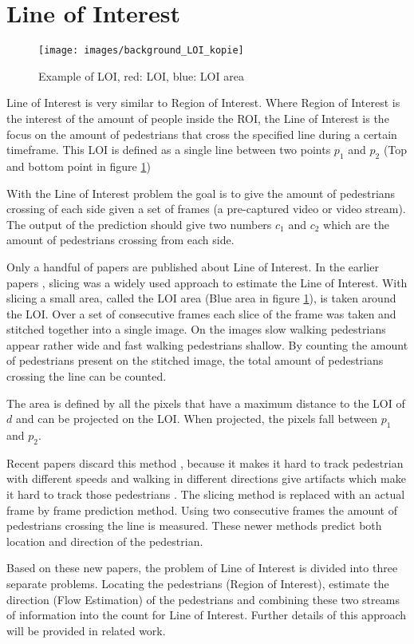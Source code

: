 \section{Line of Interest}
\begin{figure}[h]
\centering
\texttt{[image: images/background\_LOI\_kopie]}
\caption{Example of LOI, red: LOI, blue: LOI area}
\label{fig:loi_example}
\end{figure}

Line of Interest is very similar to Region of Interest. Where Region of Interest is the interest of the amount of people inside the ROI, the Line of Interest is the focus on the amount of pedestrians that cross the specified line during a certain timeframe. This LOI is defined as a single line between two points $p_1$ and $p_2$ (Top and bottom point in figure \ref{fig:loi_example})

With the Line of Interest problem the goal is to give the amount of pedestrians crossing of each side given a set of frames (a pre-captured video or video stream). The output of the prediction should give two numbers $c_1$ and $c_2$ which are the amount of pedestrians crossing from each side.

Only a handful of papers are published about Line of Interest. In the earlier papers \cite{ma_counting_2016, cao_large_2015}, slicing was a widely used approach to estimate the Line of Interest. With slicing a small area, called the LOI area (Blue area in figure \ref{fig:loi_example}), is taken around the LOI. Over a set of consecutive frames each slice of the frame was taken and stitched together into a single image. On the images slow walking pedestrians appear rather wide and fast walking pedestrians shallow. By counting the amount of pedestrians present on the stitched image, the total amount of pedestrians crossing the line can be counted.

The area is defined by all the pixels that have a maximum distance to the LOI of $d$ and can be projected on the LOI. When projected, the pixels fall between $p_1$ and $p_2$.

Recent papers discard this method \cite{leibe_crossing-line_2016, zheng_cross-line_2019}, because it makes it hard to track pedestrian with different speeds and walking in different directions give artifacts which make it hard to track those pedestrians \cite{leibe_crossing-line_2016}. The slicing method is replaced with an actual frame by frame prediction method. Using two consecutive frames the amount of pedestrians crossing the line is measured. These newer methods predict both location and direction of the pedestrian. 

Based on these new papers, the problem of Line of Interest is divided into three separate problems. Locating the pedestrians (Region of Interest), estimate the direction (Flow Estimation) of the pedestrians and combining these two streams of information into the count for Line of Interest. Further details of this approach will be provided in related work.